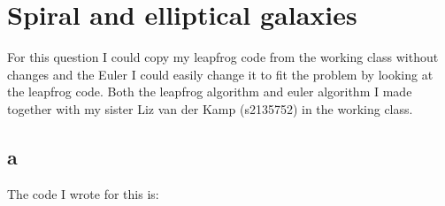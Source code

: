 \section{Spiral and elliptical galaxies}

For this question I could copy my leapfrog code from the working class without changes and the Euler I could easily change it to fit the problem by looking at the leapfrog code. 
Both the leapfrog algorithm and euler algorithm I made together with my sister Liz van der Kamp (s2135752) in the working class. 

\subsection*{a}

The code I wrote for this is:

